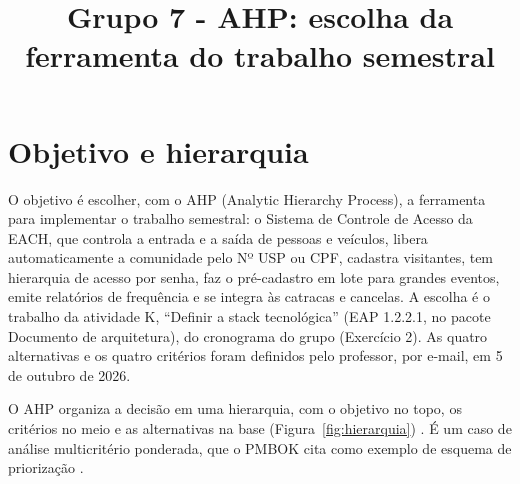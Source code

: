 \documentclass[a4paper]{article}
\title{\textbf{Grupo 7 - AHP: escolha da ferramenta do trabalho semestral}}
\begin{document}
\capa

\section{Objetivo e hierarquia}

O objetivo é escolher, com o AHP (Analytic Hierarchy Process), a ferramenta para implementar o trabalho semestral: o Sistema de Controle de Acesso da EACH, que controla a entrada e a saída de pessoas e veículos, libera automaticamente a comunidade pelo Nº USP ou CPF, cadastra visitantes, tem hierarquia de acesso por senha, faz o pré-cadastro em lote para grandes eventos, emite relatórios de frequência e se integra às catracas e cancelas. A escolha é o trabalho da atividade K, \enquote{Definir a stack tecnológica} (EAP 1.2.2.1, no pacote Documento de arquitetura), do cronograma do grupo (Exercício 2). As quatro alternativas e os quatro critérios foram definidos pelo professor, por e-mail, em 5 de outubro de 2026.

O AHP organiza a decisão em uma hierarquia, com o objetivo no topo, os critérios no meio e as alternativas na base (Figura~\ref{fig:hierarquia}) \cite{saaty, vargas2010}. É um caso de análise multicritério ponderada, que o PMBOK cita como exemplo de esquema de priorização \cite[p.~181]{pmi2021}.
\end{document}
